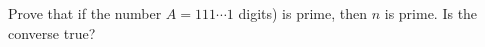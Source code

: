 Prove that if the number $A = 111 \cdots 1$  digits) is prime, then $n$ is prime. Is the converse true?